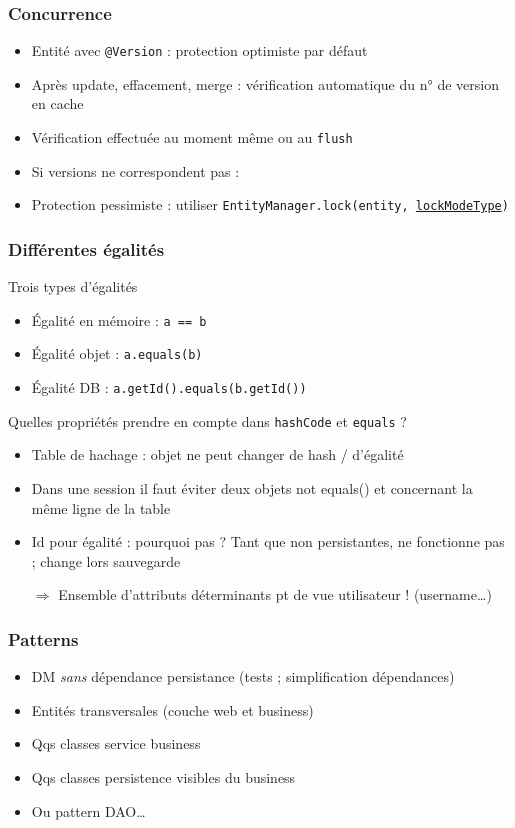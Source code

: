 \documentclass[english, french]{beamer}
\begin{document}
\begin{frame}
	\frametitle{Concurrence}
	\begin{itemize}
		\item Entité avec \texttt{@Version} : protection optimiste par défaut
		\item Après update, effacement, merge : vérification automatique du n° de version en cache%
		\item Vérification effectuée au moment même ou au \texttt{flush}
		\item Si versions ne correspondent pas : 
		\item Protection pessimiste : utiliser \texttt{EntityManager.lock(entity, \href{https://docs.oracle.com/javaee/7/api/javax/persistence/LockModeType.html}{lockModeType})}
	\end{itemize}
\end{frame}

\begin{frame}
	\frametitle{Différentes égalités}
	\begin{block}{Trois types d’égalités}
		\begin{itemize}
			\item Égalité en mémoire : \texttt{a == b}
			\item Égalité objet : \texttt{a.equals(b)}
			\item Égalité DB : \texttt{a.getId().equals(b.getId())}
		\end{itemize}
	\end{block}
	Quelles propriétés prendre en compte dans \texttt{hashCode} et \texttt{equals} ?
	\begin{itemize}
		\item Table de hachage : objet ne peut changer de hash / d’égalité
		\item Dans une session il faut éviter deux objets not equals() et concernant la même ligne de la table
		\item Id pour égalité : pourquoi pas ? \pause Tant que non persistantes, ne fonctionne pas ; change lors sauvegarde \pause
		\item[$⇒$] Ensemble d’attributs déterminants pt de vue utilisateur ! (username…)
	\end{itemize}
\end{frame}

\begin{frame}
	\frametitle{Patterns}
	\begin{itemize}
		\item DM \emph{sans} dépendance persistance (tests ;  simplification dépendances)
		\item Entités transversales (couche web et business)
		\item Qqs classes service business
		\item Qqs classes persistence visibles du business
		\item Ou pattern DAO…
	\end{itemize}
\end{frame}
\end{document}

